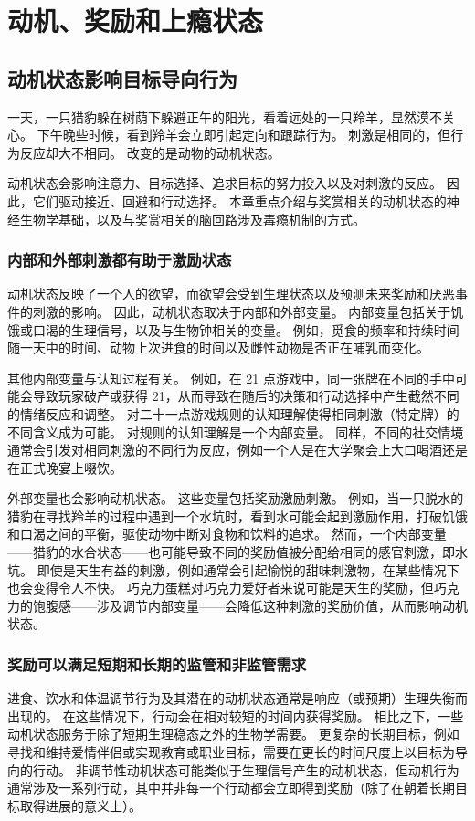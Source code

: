 \chapter{动机、奖励和上瘾状态}

\section{动机状态影响目标导向行为}
一天，一只猎豹躲在树荫下躲避正午的阳光，看着远处的一只羚羊，显然漠不关心。 下午晚些时候，看到羚羊会立即引起定向和跟踪行为。 刺激是相同的，但行为反应却大不相同。 改变的是动物的动机状态。

动机状态会影响注意力、目标选择、追求目标的努力投入以及对刺激的反应。 因此，它们驱动接近、回避和行动选择。 本章重点介绍与奖赏相关的动机状态的神经生物学基础，以及与奖赏相关的脑回路涉及毒瘾机制的方式。

\subsection{内部和外部刺激都有助于激励状态}
动机状态反映了一个人的欲望，而欲望会受到生理状态以及预测未来奖励和厌恶事件的刺激的影响。 因此，动机状态取决于内部和外部变量。 内部变量包括关于饥饿或口渴的生理信号，以及与生物钟相关的变量。 例如，觅食的频率和持续时间随一天中的时间、动物上次进食的时间以及雌性动物是否正在哺乳而变化。

其他内部变量与认知过程有关。 例如，在 21 点游戏中，同一张牌在不同的手中可能会导致玩家破产或获得 21，从而导致在随后的决策和行动选择中产生截然不同的情绪反应和调整。 对二十一点游戏规则的认知理解使得相同刺激（特定牌）的不同含义成为可能。 对规则的认知理解是一个内部变量。 同样，不同的社交情境通常会引发对相同刺激的不同行为反应，例如一个人是在大学聚会上大口喝酒还是在正式晚宴上啜饮。

外部变量也会影响动机状态。 这些变量包括奖励激励刺激。 例如，当一只脱水的猎豹在寻找羚羊的过程中遇到一个水坑时，看到水可能会起到激励作用，打破饥饿和口渴之间的平衡，驱使动物中断对食物和饮料的追求。 然而，一个内部变量——猎豹的水合状态——也可能导致不同的奖励值被分配给相同的感官刺激，即水坑。 即使是天生有益的刺激，例如通常会引起愉悦的甜味刺激物，在某些情况下也会变得令人不快。 巧克力蛋糕对巧克力爱好者来说可能是天生的奖励，但巧克力的饱腹感——涉及调节内部变量——会降低这种刺激的奖励价值，从而影响动机状态。

\subsection{奖励可以满足短期和长期的监管和非监管需求}
进食、饮水和体温调节行为及其潜在的动机状态通常是响应（或预期）生理失衡而出现的。 在这些情况下，行动会在相对较短的时间内获得奖励。 相比之下，一些动机状态服务于除了短期生理稳态之外的生物学需要。 更复杂的长期目标，例如寻找和维持爱情伴侣或实现教育或职业目标，需要在更长的时间尺度上以目标为导向的行动。 非调节性动机状态可能类似于生理信号产生的动机状态，但动机行为通常涉及一系列行动，其中并非每一个行动都会立即得到奖励（除了在朝着长期目标取得进展的意义上）。

